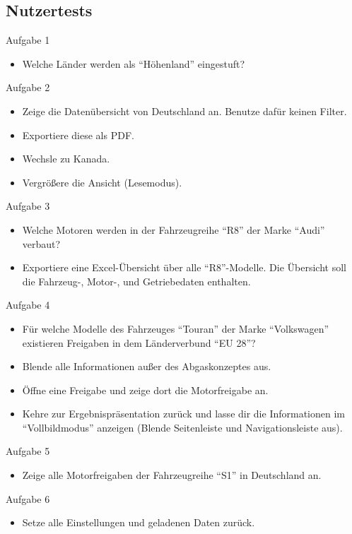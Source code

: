 \subsection{Nutzertests}
Aufgabe 1
\begin{itemize}
	\item Welche Länder werden als \enquote{Höhenland} eingestuft?
\end{itemize}
Aufgabe 2
\begin{itemize}
	\item Zeige die Datenübersicht von Deutschland an. Benutze dafür keinen Filter.
	\item Exportiere diese als PDF.
	\item Wechsle zu Kanada.
	\item Vergrößere die Ansicht (Lesemodus).
\end{itemize}
Aufgabe 3
\begin{itemize}
	\item Welche Motoren werden in der Fahrzeugreihe \enquote{R8} der Marke \enquote{Audi} verbaut?
	\item Exportiere eine Excel-Übersicht über alle \enquote{R8}-Modelle. Die Übersicht soll die Fahrzeug-, Motor-, und Getriebedaten enthalten.
\end{itemize}
Aufgabe 4
\begin{itemize}
	\item Für welche Modelle des Fahrzeuges \enquote{Touran} der Marke \enquote{Volkswagen} existieren Freigaben in dem Länderverbund \enquote{EU 28}?
	\item Blende alle Informationen außer des Abgaskonzeptes aus.
	\item Öffne eine Freigabe und zeige dort die Motorfreigabe an.
	\item Kehre zur Ergebnispräsentation zurück und lasse dir die Informationen im \enquote{Vollbildmodus} anzeigen (Blende Seitenleiste und Navigationsleiste aus). 
\end{itemize}
Aufgabe 5
\begin{itemize}
	\item Zeige alle Motorfreigaben der Fahrzeugreihe \enquote{S1} in Deutschland an.
\end{itemize}
Aufgabe 6
\begin{itemize}
	\item Setze alle Einstellungen und geladenen Daten zurück.
\end{itemize}
